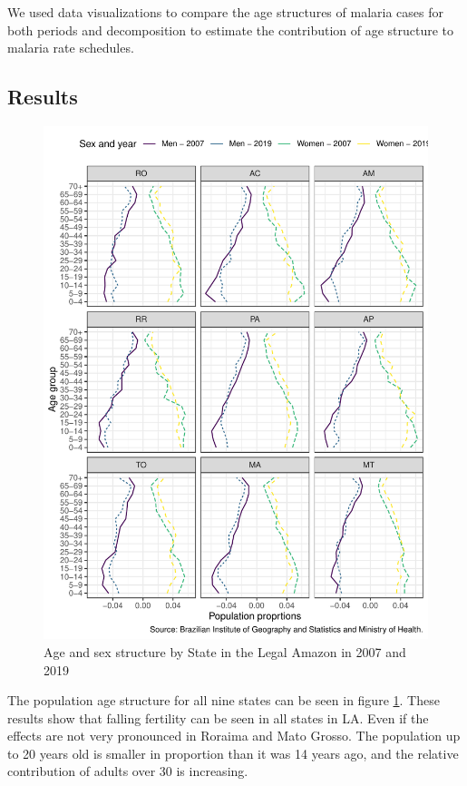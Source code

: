 \documentclass[
  12pt,
]{article}
\begin{document}
We used data visualizations to compare the age structures of malaria cases for both periods and decomposition \citep{prestonDemographyMeasuringModeling2000} to estimate the contribution of age structure to malaria rate schedules.

\hypertarget{results}{%
\subsection{Results}\label{results}}

\begin{figure}
\centering
\includegraphics{piramide.pdf}
\caption{\label{fig:piramide}Age and sex structure by State in the Legal Amazon in 2007 and 2019}
\end{figure}

The population age structure for all nine states can be seen in figure \ref{fig:piramide}. These results show that falling fertility can be seen in all states in LA. Even if the effects are not very pronounced in Roraima and Mato Grosso. The population up to 20 years old is smaller in proportion than it was 14 years ago, and the relative contribution of adults over 30 is increasing.
\end{document}
